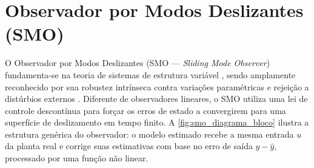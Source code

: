 \section{Observador por Modos Deslizantes (SMO)}
\label{sec:SMO_revbib}
O Observador por Modos Deslizantes (SMO — \textit{Sliding Mode Observer}) fundamenta-se na teoria de sistemas de estrutura variável \cite{Utkin1992}, sendo amplamente reconhecido por sua robustez intrínseca contra variações paramétricas e rejeição a distúrbios externos \cite{AbKaf2024,OkLee2022}. Diferente de observadores lineares, o SMO utiliza uma lei de controle descontínua para forçar os erros de estado a convergirem para uma superfície de deslizamento em tempo finito. A \autoref{fig:smo_diagrama_bloco} ilustra a estrutura genérica do observador: o modelo estimado recebe a mesma entrada $u$ da planta real e corrige suas estimativas com base no erro de saída $y - \hat{y}$, processado por uma função não linear.

